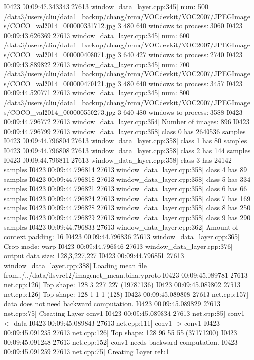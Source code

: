 \documentclass{article}
\begin{document}
I0423 00:09:43.343343 27613 window_data_layer.cpp:345] num: 500 /data3/users/cliu/data1_backup/chang/rcnn/VOCdevkit/VOC2007/JPEGImages/COCO_val2014_000000331712.jpg 3 480 640 windows to process: 3060
I0423 00:09:43.626369 27613 window_data_layer.cpp:345] num: 600 /data3/users/cliu/data1_backup/chang/rcnn/VOCdevkit/VOC2007/JPEGImages/COCO_val2014_000000408071.jpg 3 640 427 windows to process: 2740
I0423 00:09:43.889822 27613 window_data_layer.cpp:345] num: 700 /data3/users/cliu/data1_backup/chang/rcnn/VOCdevkit/VOC2007/JPEGImages/COCO_val2014_000000470121.jpg 3 480 640 windows to process: 3457
I0423 00:09:44.520771 27613 window_data_layer.cpp:345] num: 800 /data3/users/cliu/data1_backup/chang/rcnn/VOCdevkit/VOC2007/JPEGImages/COCO_val2014_000000550273.jpg 3 640 480 windows to process: 3588
I0423 00:09:44.796772 27613 window_data_layer.cpp:354] Number of images: 896
I0423 00:09:44.796799 27613 window_data_layer.cpp:358] class 0 has 2640536 samples
I0423 00:09:44.796804 27613 window_data_layer.cpp:358] class 1 has 80 samples
I0423 00:09:44.796808 27613 window_data_layer.cpp:358] class 2 has 144 samples
I0423 00:09:44.796811 27613 window_data_layer.cpp:358] class 3 has 24142 samples
I0423 00:09:44.796814 27613 window_data_layer.cpp:358] class 4 has 89 samples
I0423 00:09:44.796818 27613 window_data_layer.cpp:358] class 5 has 334 samples
I0423 00:09:44.796821 27613 window_data_layer.cpp:358] class 6 has 66 samples
I0423 00:09:44.796824 27613 window_data_layer.cpp:358] class 7 has 169 samples
I0423 00:09:44.796828 27613 window_data_layer.cpp:358] class 8 has 250 samples
I0423 00:09:44.796829 27613 window_data_layer.cpp:358] class 9 has 290 samples
I0423 00:09:44.796833 27613 window_data_layer.cpp:362] Amount of context padding: 16
I0423 00:09:44.796836 27613 window_data_layer.cpp:365] Crop mode: warp
I0423 00:09:44.796846 27613 window_data_layer.cpp:376] output data size: 128,3,227,227
I0423 00:09:44.796851 27613 window_data_layer.cpp:388] Loading mean file from../../data/ilsvrc12/imagenet_mean.binaryproto
I0423 00:09:45.089781 27613 net.cpp:126] Top shape: 128 3 227 227 (19787136)
I0423 00:09:45.089802 27613 net.cpp:126] Top shape: 128 1 1 1 (128)
I0423 00:09:45.089808 27613 net.cpp:157] data does not need backward computation.
I0423 00:09:45.089829 27613 net.cpp:75] Creating Layer conv1
I0423 00:09:45.089834 27613 net.cpp:85] conv1 <- data
I0423 00:09:45.089843 27613 net.cpp:111] conv1 -> conv1
I0423 00:09:45.091235 27613 net.cpp:126] Top shape: 128 96 55 55 (37171200)
I0423 00:09:45.091248 27613 net.cpp:152] conv1 needs backward computation.
I0423 00:09:45.091259 27613 net.cpp:75] Creating Layer relu1
\end{document}
